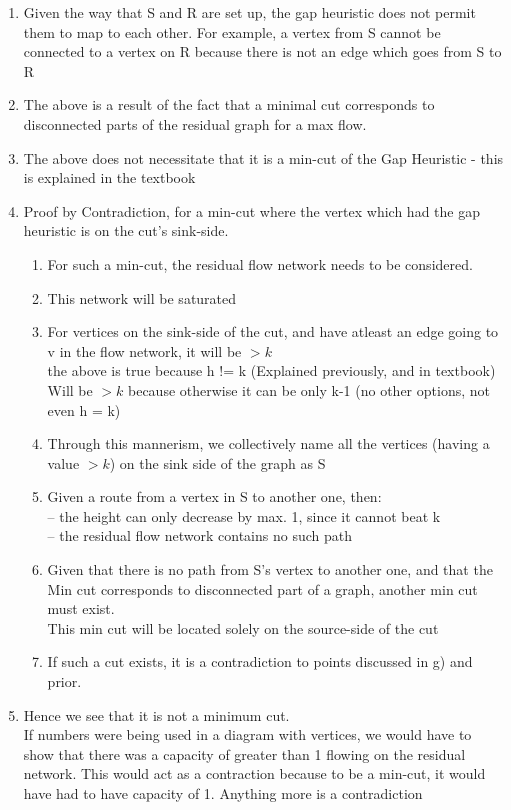 \documentclass[11pt]{article}
\begin{document}
\begin{enumerate}
\begin{enumerate}
        \item Given the way that S and R are set up, the gap heuristic does not permit them to map to each other. For example, a vertex from S cannot be connected to a vertex on R because there is not an edge which goes from S to R
        \item The above is a result of the fact that a minimal cut corresponds to disconnected parts of the residual graph for a max flow.
        \item The above does not necessitate that it is a min-cut of the Gap Heuristic - this is explained in the textbook
        \item Proof by Contradiction, for a min-cut where the vertex which had the gap heuristic is on the cut's sink-side.
        \begin{enumerate}
            \item For such a min-cut, the residual flow network needs to be considered.
            \item This network will be saturated 
            \item For vertices on the sink-side of the cut, and have atleast an edge going to v in the flow network, it will be $>k$
            \\the above is true because h != k (Explained previously, and in textbook)
            \\Will be $>k$ because otherwise it can be only k-1 (no other options, not even h = k)
            \item Through this mannerism, we collectively name all the vertices (having a value $>k$) on the sink side of the graph as S
            \item Given a route from a vertex in S to another one, then:\\
            -- the height can only decrease by max. 1, since it cannot beat k\\
            -- the residual flow network contains no such path
            \item Given that there is no path from S's vertex to another one, and that the Min cut corresponds to disconnected part of a graph, another min cut must exist.\\
            This min cut will be located solely on the source-side of the cut
            \item If such a cut exists, it is a contradiction to points discussed in g) and prior. 
        \end{enumerate}
        \item Hence we see that it is not a minimum cut. \\If numbers were being used in a diagram with vertices, we would have to show that there was a capacity of greater than 1 flowing on the residual network. This would act as a contraction because to be a min-cut, it would have had to have capacity of 1. Anything more is a contradiction
    \end{enumerate}
    

\end{enumerate}
\end{document}
